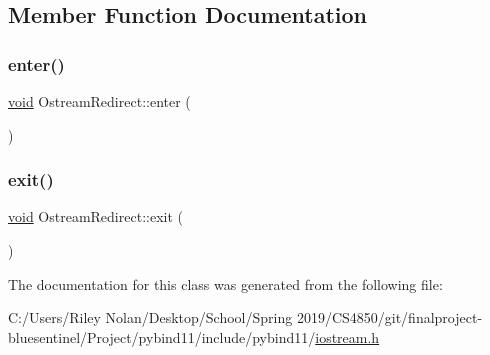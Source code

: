 \subsection{Member Function Documentation}
\mbox{\label{class_ostream_redirect_a3cf2fbfe1135bba2c83297b80a12517c}} 
\subsubsection{\texorpdfstring{enter()}{enter()}}
{\footnotesize\ttfamily \mbox{\hyperlink{_s_d_l__opengles2__gl2ext_8h_ae5d8fa23ad07c48bb609509eae494c95}{void}} Ostream\+Redirect\+::enter (\begin{DoxyParamCaption}{ }\end{DoxyParamCaption})\hspace{0.3cm}{\ttfamily [inline]}}

\mbox{\label{class_ostream_redirect_afc4e2df991c8740540abbae9731607ff}} 
\subsubsection{\texorpdfstring{exit()}{exit()}}
{\footnotesize\ttfamily \mbox{\hyperlink{_s_d_l__opengles2__gl2ext_8h_ae5d8fa23ad07c48bb609509eae494c95}{void}} Ostream\+Redirect\+::exit (\begin{DoxyParamCaption}{ }\end{DoxyParamCaption})\hspace{0.3cm}{\ttfamily [inline]}}



The documentation for this class was generated from the following file\+:\begin{DoxyCompactItemize}
\item 
C\+:/\+Users/\+Riley Nolan/\+Desktop/\+School/\+Spring 2019/\+C\+S4850/git/finalproject-\/bluesentinel/\+Project/pybind11/include/pybind11/\mbox{\hyperlink{iostream_8h}{iostream.\+h}}\end{DoxyCompactItemize}
